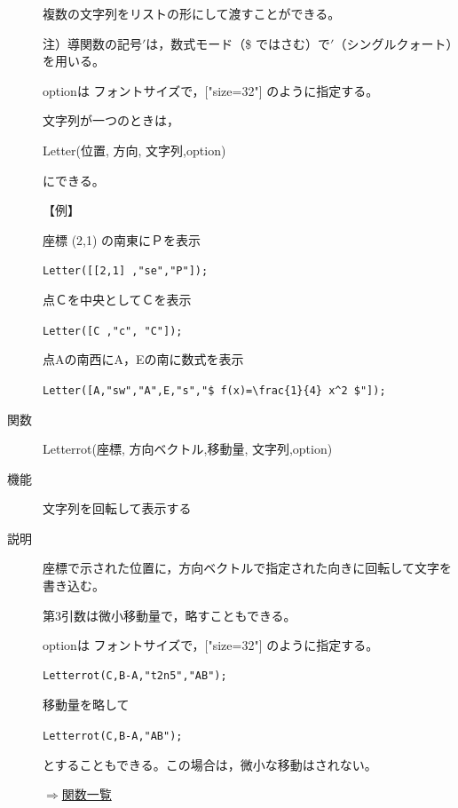 \documentclass[papersize,a4paper,12pt,uplatex]{jsarticle}
\begin{document}
\begin{description}
複数の文字列をリストの形にして渡すことができる。

注）導関数の記号$'$は，数式モード（\$ ではさむ）で$'$（シングルクォート）を用いる。

optionは フォントサイズで，["size=32"] のように指定する。

文字列が一つのときは，

Letter(位置, 方向, 文字列,option)

にできる。

\vspace{\baselineskip}
【例】

座標 (2,1) の南東にＰを表示

\hspace{10mm}\verb|Letter([[2,1] ,"se","P"]);|

点Ｃを中央としてＣを表示

\hspace{10mm}\verb|Letter([C ,"c", "C"]);|

点Aの南西にA，Eの南に数式を表示

\hspace{10mm}\verb|Letter([A,"sw","A",E,"s","$ f(x)=\frac{1}{4} x^2 $"]);| 

\vspace{\baselineskip}
\hypertarget{letterrot}{}\item[関数]Letterrot(座標, 方向ベクトル,移動量, 文字列,option)
\item[機能]文字列を回転して表示する
\item[説明]座標で示された位置に，方向ベクトルで指定された向きに回転して文字を書き込む。

第3引数は微小移動量で，略すこともできる。

optionは フォントサイズで，["size=32"] のように指定する。

\begin{verbatim}
Letterrot(C,B-A,"t2n5","AB");
\end{verbatim}

移動量を略して

\hspace{10mm}\verb|Letterrot(C,B-A,"AB");|

とすることもできる。この場合は，微小な移動はされない。

\begin{flushright}\hyperlink{functionlist}{$\Rightarrow$関数一覧}\end{flushright}

\end{description}
\end{document}
